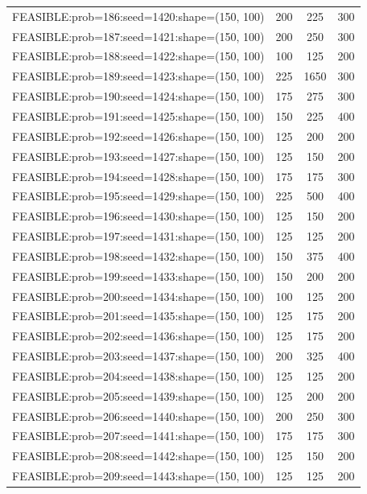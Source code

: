 \begin{longtable}{lccc}
FEASIBLE:prob=186:seed=1420:shape=(150, 100) &  200 &   225 &    300 \\
FEASIBLE:prob=187:seed=1421:shape=(150, 100) &  200 &   250 &    300 \\
FEASIBLE:prob=188:seed=1422:shape=(150, 100) &  100 &   125 &    200 \\
FEASIBLE:prob=189:seed=1423:shape=(150, 100) &  225 &  1650 &    300 \\
FEASIBLE:prob=190:seed=1424:shape=(150, 100) &  175 &   275 &    300 \\
FEASIBLE:prob=191:seed=1425:shape=(150, 100) &  150 &   225 &    400 \\
FEASIBLE:prob=192:seed=1426:shape=(150, 100) &  125 &   200 &    200 \\
FEASIBLE:prob=193:seed=1427:shape=(150, 100) &  125 &   150 &    200 \\
FEASIBLE:prob=194:seed=1428:shape=(150, 100) &  175 &   175 &    300 \\
FEASIBLE:prob=195:seed=1429:shape=(150, 100) &  225 &   500 &    400 \\
FEASIBLE:prob=196:seed=1430:shape=(150, 100) &  125 &   150 &    200 \\
FEASIBLE:prob=197:seed=1431:shape=(150, 100) &  125 &   125 &    200 \\
FEASIBLE:prob=198:seed=1432:shape=(150, 100) &  150 &   375 &    400 \\
FEASIBLE:prob=199:seed=1433:shape=(150, 100) &  150 &   200 &    200 \\
FEASIBLE:prob=200:seed=1434:shape=(150, 100) &  100 &   125 &    200 \\
FEASIBLE:prob=201:seed=1435:shape=(150, 100) &  125 &   175 &    200 \\
FEASIBLE:prob=202:seed=1436:shape=(150, 100) &  125 &   175 &    200 \\
FEASIBLE:prob=203:seed=1437:shape=(150, 100) &  200 &   325 &    400 \\
FEASIBLE:prob=204:seed=1438:shape=(150, 100) &  125 &   125 &    200 \\
FEASIBLE:prob=205:seed=1439:shape=(150, 100) &  125 &   200 &    200 \\
FEASIBLE:prob=206:seed=1440:shape=(150, 100) &  200 &   250 &    300 \\
FEASIBLE:prob=207:seed=1441:shape=(150, 100) &  175 &   175 &    300 \\
FEASIBLE:prob=208:seed=1442:shape=(150, 100) &  125 &   150 &    200 \\
FEASIBLE:prob=209:seed=1443:shape=(150, 100) &  125 &   125 &    200 \\

\end{longtable}
